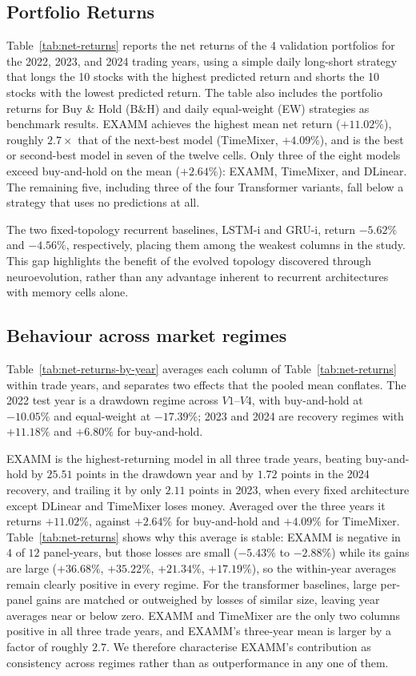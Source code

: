 \subsection{Portfolio Returns}

Table~\ref{tab:net-returns} reports the net returns of the 4 validation portfolios for the 2022, 2023, and 2024 trading years, using a simple daily long-short strategy that longs the 10 stocks with the highest predicted return and shorts the 10 stocks with the lowest predicted return. The table also includes the portfolio returns for Buy \& Hold (B\&H) and daily equal-weight (EW) strategies as benchmark results. EXAMM achieves the highest mean net return ($+11.02\%$), roughly $2.7\times$ that of the next-best model (TimeMixer, $+4.09\%$), and is the best or second-best model in seven of the twelve cells. Only three of the eight models exceed buy-and-hold on the mean ($+2.64\%$): EXAMM, TimeMixer, and DLinear. The remaining five, including three of the four Transformer variants, fall below a strategy that uses no predictions at all.

The two fixed-topology recurrent baselines, LSTM-i and GRU-i, return $-5.62\%$ and $-4.56\%$, respectively, placing them among the weakest columns in the study. This gap highlights the benefit of the evolved topology discovered through neuroevolution, rather than any advantage inherent to recurrent architectures with memory cells alone.

\subsection{Behaviour across market regimes}


Table~\ref{tab:net-returns-by-year} averages each column of Table~\ref{tab:net-returns} within trade years, and separates two effects that the pooled mean conflates. The 2022 test year is a drawdown regime across $V1$--$V4$, with buy-and-hold at $-10.05\%$ and equal-weight at $-17.39\%$; 2023 and 2024 are recovery regimes with $+11.18\%$ and $+6.80\%$ for buy-and-hold.

EXAMM is the highest-returning model in all three trade years, beating buy-and-hold by $25.51$ points in the drawdown year and by $1.72$ points in the 2024 recovery, and trailing it by only $2.11$ points in 2023, when every fixed architecture except DLinear and TimeMixer loses money. Averaged over the three years it returns $+11.02\%$, against $+2.64\%$ for buy-and-hold and $+4.09\%$ for TimeMixer. Table~\ref{tab:net-returns} shows why this average is stable: EXAMM is negative in $4$ of $12$ panel-years, but those losses are small ($-5.43\%$ to $-2.88\%$) while its gains are large ($+36.68\%$, $+35.22\%$, $+21.34\%$, $+17.19\%$), so the within-year averages remain clearly positive in every regime. For the transformer baselines, large per-panel gains are matched or outweighed by losses of similar size, leaving year averages near or below zero. EXAMM and TimeMixer are the only two columns positive in all three trade years, and EXAMM's three-year mean is larger by a factor of roughly $2.7$. We therefore characterise EXAMM's contribution as consistency across regimes rather than as outperformance in any one of them.

